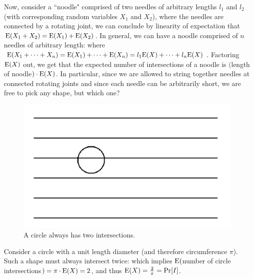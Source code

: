 \documentclass[11pt]{article}
\def\Ex#1{{\rm E}(#1)}
\begin{document}
Now, consider a ``noodle" comprised of
two needles of arbitrary lengths $l_1$ and $l_2$ (with corresponding random variables $X_1$ and $X_2$),
where the needles are connected by a rotating joint, we can conclude by linearity of expectation that
$\Ex{X_1 + X_2} = \Ex{X_1} + \Ex{X_2}$.  In general, we can have a noodle comprised of $n$ needles
of arbitrary length:
where $\Ex{X_1 + \cdots + X_n} = \Ex{X_1} + \cdots + \Ex{X_n} = l_1\Ex{X} + \cdots + l_n\Ex{X}$.  Factoring
$\Ex{X}$ out, we get that the expected number of intersections of a noodle is $($length of noodle$) \cdot \Ex{X}$.
In particular, since we are allowed to string together needles at connected rotating joints and since each needle
can be arbitrarily short, we are free to pick any shape, but which one?  

\begin{figure}[h]
\begin{center}
\includegraphics[scale=0.4]{circle.pdf}
\end{center}
\caption{A circle always has two intersections.}
\label{fig:circle}
\end{figure}

Consider a circle with a unit
length diameter (and therefore circumference $\pi$).  Such a shape must always intersect twice:
which implies $\Ex{$number of circle intersections$} = \pi \cdot \Ex{X} = 2$, and
thus $\Ex{X} = \frac{2}{\pi} = \Pr[I]$.
\end{document}
